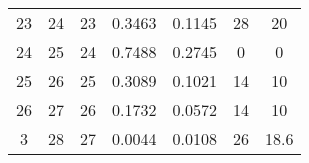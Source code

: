 \begin{table}
\begin{adjustbox}{width=0.95\textwidth,center=\textwidth}
\begin{tabular}{ccccccc}
23                                                        & 24                                                          & 23                                                  & 0.3463                                                                    & 0.1145                                                                    & 28                                                                          & 20                                                                               \\
24                                                        & 25                                                          & 24                                                  & 0.7488                                                                    & 0.2745                                                                    & 0                                                                           & 0                                                                                \\
25                                                        & 26                                                          & 25                                                  & 0.3089                                                                    & 0.1021                                                                    & 14                                                                          & 10                                                                               \\
26                                                        & 27                                                          & 26                                                  & 0.1732                                                                    & 0.0572                                                                    & 14                                                                          & 10                                                                               \\
3                                                         & 28                                                          & 27                                                  & 0.0044                                                                    & 0.0108                                                                    & 26                                                                          & 18.6                                                                             \\

\end{tabular}
\end{adjustbox}
\end{table}

